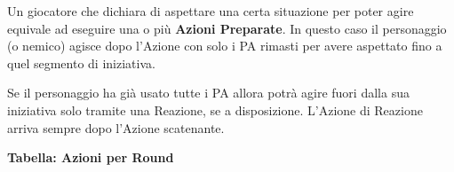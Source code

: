 \documentclass[12pt,a4paper,twoside,openany]{book}
\begin{document}
\begin{multicols}{2}
Un giocatore che dichiara di aspettare una certa situazione per poter agire equivale ad eseguire una o più \textbf{Azioni Preparate}. In questo caso il personaggio (o nemico) agisce dopo l'Azione con solo i PA rimasti per avere aspettato fino a quel segmento di iniziativa.

Se il personaggio ha già usato tutte i PA allora potrà agire fuori dalla sua iniziativa solo tramite una Reazione, se a disposizione. L'Azione di Reazione arriva sempre dopo l'Azione scatenante.

\bigskip

\end{multicols}

\textbf{Tabella: Azioni per Round}
\end{document}
